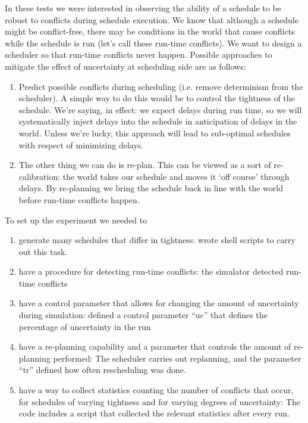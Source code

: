 \documentclass[conference]{IEEEtran}
\begin{document}
In these tests we were interested in observing the ability of a schedule to be robust to conflicts during schedule execution. We know that although a schedule might be conflict-free, there may be conditions in the world that cause conflicts while the schedule is run (let's call these run-time conflicts). We want to design a scheduler so that run-time conflicts never happen. Possible approaches to mitigate the effect of uncertainty at scheduling side are as follows:

\begin{enumerate}
	\item Predict possible conflicts during scheduling (i.e. remove determinism from the scheduler). A simple way to do this would be to control the tightness of the schedule. We're saying, in effect: we expect delays during run time, so we will systematically inject delays into the schedule in anticipation of delays in the world. Unless we're lucky, this approach will lead to sub-optimal schedules with respect of minimizing delays.
	\item The other thing we can do is re-plan. This can be viewed as a sort of re-calibration: the world takes our schedule and moves it `off course' through delays. By re-planning we bring the schedule back in line with the world before run-time conflicts happen.
\end{enumerate}

To set up the experiment we needed to

\begin{enumerate}
	\item generate many schedules that differ in tightness: wrote shell scripts to carry out this task.
	\item have a procedure for detecting run-time conflicts: the simulator detected run-time conflicts
	\item have a control parameter that allows for changing the amount of uncertainty during simulation: defined a control parameter “uc” that defines the percentage of uncertainty in the run
	\item have a re-planning capability and a parameter that controls the amount of re-planning performed: The scheduler carries out replanning, and the parameter “tr” defined how often rescheduling was done. 
	\item have a way to collect statistics counting the number of conflicts that occur, for schedules of varying tightness and for varying degrees of uncertainty: The code includes a  script that collected the relevant statistics after every run. 
\end{enumerate}
\end{document}
